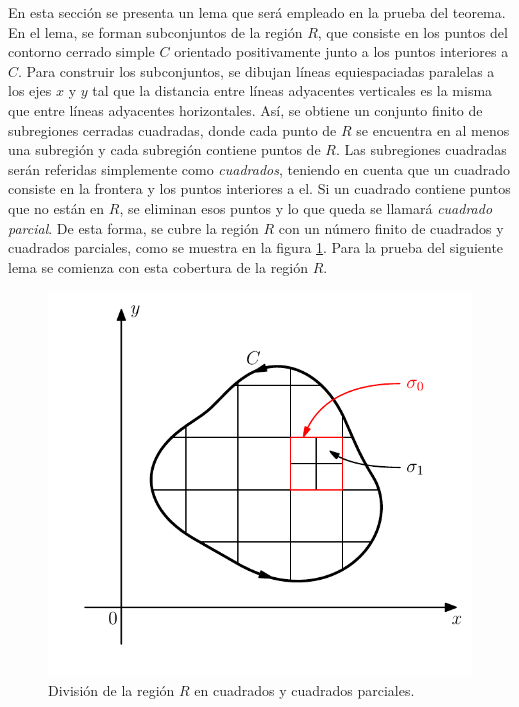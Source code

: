 \documentclass[a4paper]{report}
\begin{document}
En esta sección se presenta un lema que será empleado en la prueba del teorema. En el lema, se forman subconjuntos de la región \(R\), que consiste en los puntos del contorno cerrado simple \(C\) orientado positivamente junto a los puntos interiores a \(C\). Para construir los subconjuntos, se dibujan líneas equiespaciadas paralelas a los ejes \(x\) y \(y\) tal que la distancia entre líneas adyacentes verticales es la misma que entre líneas adyacentes horizontales. Así, se obtiene un conjunto finito de subregiones cerradas cuadradas, donde cada punto de \(R\) se encuentra en al menos una subregión y cada subregión contiene puntos de \(R\). Las subregiones cuadradas serán referidas simplemente como \emph{cuadrados}, teniendo en cuenta que un cuadrado consiste en la frontera y los puntos  interiores a el. Si un cuadrado contiene puntos que no están en \(R\), se eliminan esos puntos y lo que queda se llamará \emph{cuadrado parcial}. De esta forma, se cubre la región \(R\) con un número finito de cuadrados y cuadrados parciales, como se muestra en la figura \ref{fig:cauchy_goursat_lemma_mesh}. Para la prueba del siguiente lema se comienza con esta cobertura de la región \(R\).
\begin{figure}[!htb]
  \begin{minipage}[c]{0.5\textwidth}
    \includegraphics[width=\textwidth]{figuras/cauchy_goursat_lemma_mesh.pdf}
  \end{minipage}\hfill
  \begin{minipage}[c]{0.4\textwidth}
    \caption{
       División de la región \(R\) en cuadrados y cuadrados parciales.
    }\label{fig:cauchy_goursat_lemma_mesh}
  \end{minipage}
\end{figure}
\end{document}
